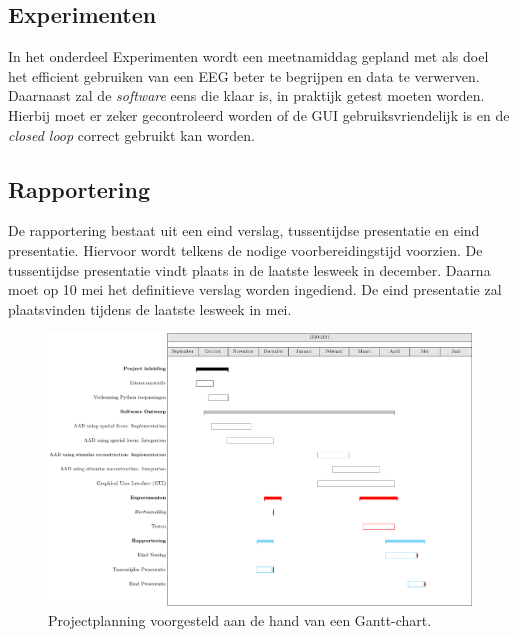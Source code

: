 \documentclass[a4paper,kul]{kulakarticle}
\begin{document}
	\subsection*{Experimenten}
	In het onderdeel Experimenten wordt een meetnamiddag gepland met als doel het efficient gebruiken van een EEG beter te begrijpen en data te verwerven. Daarnaast zal de \textit{software} eens die klaar is, in praktijk getest moeten worden. Hierbij moet er zeker gecontroleerd worden of de GUI gebruiksvriendelijk is en de \textit{closed loop} correct gebruikt kan worden.\\
	
	\subsection*{Rapportering}
	De rapportering bestaat uit een eind verslag, tussentijdse presentatie en eind presentatie. Hiervoor wordt telkens de nodige voorbereidingstijd voorzien. De tussentijdse presentatie vindt plaats in de laatste lesweek in december. Daarna moet op 10 mei het definitieve verslag worden ingediend. De eind presentatie zal plaatsvinden tijdens de laatste lesweek in mei.\\
	
		
\begin{figure}[h]
		\includegraphics[scale=0.55]{Ganttchart2.pdf} 
		\caption{Projectplanning voorgesteld aan de hand van een Gantt-chart.}
		\label{fig:ganttchart}
	\end{figure}
	
\end{document}

